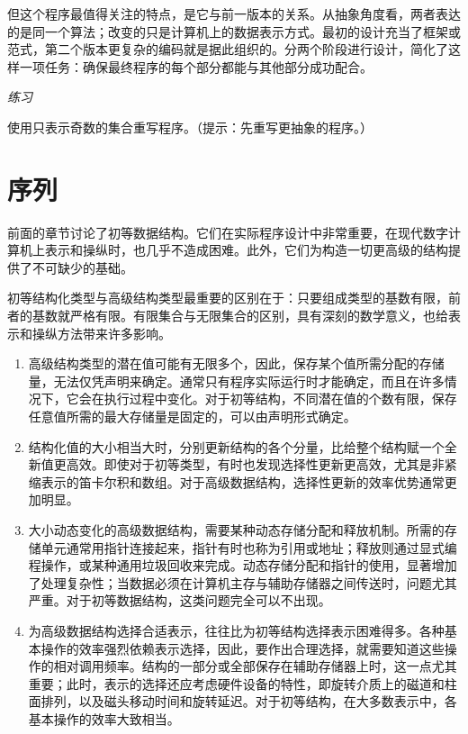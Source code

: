 但这个程序最值得关注的特点，是它与前一版本的关系。从抽象角度看，两者表达的是同一个算法；改变的只是计算机上的数据表示方式。最初的设计充当了框架或范式，第二个版本更复杂的编码就是据此组织的。分两个阶段进行设计，简化了这样一项任务：确保最终程序的每个部分都能与其他部分成功配合。

\noindent
\textit{练习}
\nopagebreak

\noindent
使用只表示奇数的集合重写程序。（提示：先重写更抽象的程序。）
\section[序列]{序列}

前面的章节讨论了初等数据结构。它们在实际程序设计中非常重要，在现代数字计算机上表示和操纵时，也几乎不造成困难。此外，它们为构造一切更高级的结构提供了不可缺少的基础。

初等结构化类型与高级结构类型最重要的区别在于：只要组成类型的基数有限，前者的基数就严格有限。有限集合与无限集合的区别，具有深刻的数学意义，也给表示和操纵方法带来许多影响。

\begin{enumerate}[wide, nosep, label=(\arabic*)]
	\item 高级结构类型的潜在值可能有无限多个，因此，保存某个值所需分配的存储量，无法仅凭声明来确定。通常只有程序实际运行时才能确定，而且在许多情况下，它会在执行过程中变化。对于初等结构，不同潜在值的个数有限，保存任意值所需的最大存储量是固定的，可以由声明形式确定。

	\item 结构化值的大小相当大时，分别更新结构的各个分量，比给整个结构赋一个全新值更高效。即使对于初等类型，有时也发现选择性更新更高效，尤其是非紧缩表示的笛卡尔积和数组。对于高级数据结构，选择性更新的效率优势通常更加明显。

	\item 大小动态变化的高级数据结构，需要某种动态存储分配和释放机制。所需的存储单元通常用指针连接起来，指针有时也称为引用或地址；释放则通过显式编程操作，或某种通用垃圾回收来完成。动态存储分配和指针的使用，显著增加了处理复杂性；当数据必须在计算机主存与辅助存储器之间传送时，问题尤其严重。对于初等数据结构，这类问题完全可以不出现。

	\item 为高级数据结构选择合适表示，往往比为初等结构选择表示困难得多。各种基本操作的效率强烈依赖表示选择，因此，要作出合理选择，就需要知道这些操作的相对调用频率。结构的一部分或全部保存在辅助存储器上时，这一点尤其重要；此时，表示的选择还应考虑硬件设备的特性，即旋转介质上的磁道和柱面排列，以及磁头移动时间和旋转延迟。对于初等结构，在大多数表示中，各基本操作的效率大致相当。
\end{enumerate}

